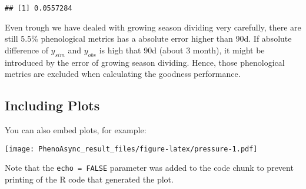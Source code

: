 \documentclass[
]{article}
\begin{document}
\begin{verbatim}
## [1] 0.0557284
\end{verbatim}

Even trough we have dealed with growing season dividing very carefully,
there are still 5.5\% phenological metrics has a absolute error higher
than 90d. If absolute difference of \(y_{sim}\) and \(y_{obs}\) is high
that 90d (about 3 month), it might be introduced by the error of growing
season dividing. Hence, those phenological metrics are excluded when
calculating the goodness performance.

\hypertarget{including-plots}{%
\subsection{Including Plots}\label{including-plots}}

You can also embed plots, for example:

\texttt{[image: PhenoAsync\_result\_files/figure-latex/pressure-1.pdf]}

Note that the \texttt{echo\ =\ FALSE} parameter was added to the code
chunk to prevent printing of the R code that generated the plot.
\end{document}
